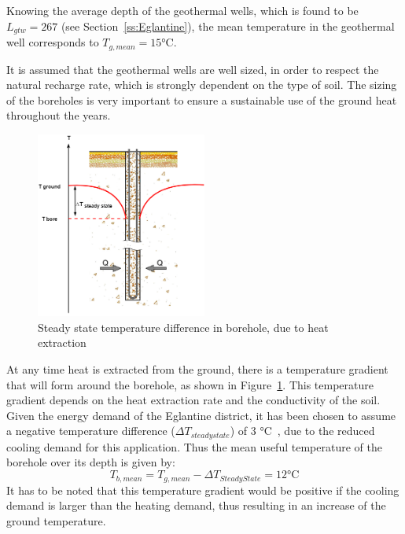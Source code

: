 \documentclass{article}
\begin{document}
Knowing the average depth of the geothermal wells, which is found to be $L_{gtw} = 267$ (see Section~\ref{ss:Eglantine}), the mean temperature in the geothermal well corresponds to $T_{g, mean} = 15 \si{\celsius}$.

It is assumed that the geothermal wells are well sized, in order to respect the natural recharge rate, which is strongly dependent on the type of soil. The sizing of the boreholes is very important to ensure a sustainable use of the ground heat throughout the years. \\

\begin{figure}[htp]
	\centering
	\includegraphics[width=0.5\textwidth]{GTW_T_profile.png}
	\caption{Steady state temperature difference in borehole, due to heat extraction}
	\label{fig:GTW_T}
\end{figure}

At any time heat is extracted from the ground, there is a temperature gradient that will form around the borehole, as shown in Figure~\ref{fig:GTW_T}. This temperature gradient depends on the heat extraction rate and the conductivity of the soil. Given the energy demand of the Eglantine district, it has been chosen to assume a negative temperature difference ($\Delta T_{steady state}$) of 3 \si{\celsius}~\cite{guoTechnoeconomicComparisonDirect2012,hanSensitivityAnalysisVertical2016}, due to the reduced cooling demand for this application. Thus the mean useful temperature of the borehole over its depth is given by:
\begin{equation}
	T_{b, mean} = T_{g, mean} -\Delta T_{Steady State} = 12 \si{\celsius}
\end{equation}
It has to be noted that this temperature gradient would be positive if the cooling demand is larger than the heating demand, thus resulting in an increase of the ground temperature.\\
\end{document}
